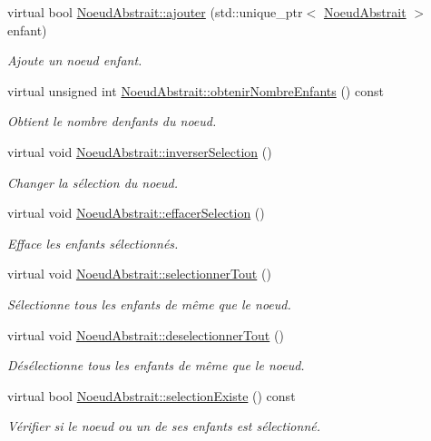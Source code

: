 \begin{DoxyCompactItemize}
virtual bool \hyperlink{group__inf2990_ga7051399643afa57468ef07444a085a85}{Noeud\+Abstrait\+::ajouter} (std\+::unique\+\_\+ptr$<$ \hyperlink{class_noeud_abstrait}{Noeud\+Abstrait} $>$ enfant)
\begin{DoxyCompactList}\small\item\em Ajoute un noeud enfant. \end{DoxyCompactList}\item 
virtual unsigned int \hyperlink{group__inf2990_gad5a99959e905fc2d9f0fef16a02546a2}{Noeud\+Abstrait\+::obtenir\+Nombre\+Enfants} () const 
\begin{DoxyCompactList}\small\item\em Obtient le nombre d\textquotesingle{}enfants du noeud. \end{DoxyCompactList}\item 
virtual void \hyperlink{group__inf2990_ga2516eef94f98d4951baff6fd45020725}{Noeud\+Abstrait\+::inverser\+Selection} ()
\begin{DoxyCompactList}\small\item\em Changer la sélection du noeud. \end{DoxyCompactList}\item 
virtual void \hyperlink{group__inf2990_gaf6440c1b4ab6861f0ace6ba410c1fc84}{Noeud\+Abstrait\+::effacer\+Selection} ()
\begin{DoxyCompactList}\small\item\em Efface les enfants sélectionnés. \end{DoxyCompactList}\item 
virtual void \hyperlink{group__inf2990_gaa9b1fa06dad2695ea6870411c62652b3}{Noeud\+Abstrait\+::selectionner\+Tout} ()
\begin{DoxyCompactList}\small\item\em Sélectionne tous les enfants de même que le noeud. \end{DoxyCompactList}\item 
virtual void \hyperlink{group__inf2990_ga4f942bd122fc3402537ecac737c5248a}{Noeud\+Abstrait\+::deselectionner\+Tout} ()
\begin{DoxyCompactList}\small\item\em Désélectionne tous les enfants de même que le noeud. \end{DoxyCompactList}\item 
virtual bool \hyperlink{group__inf2990_gae7c702b865babd20ddd30dd776adc82b}{Noeud\+Abstrait\+::selection\+Existe} () const 
\begin{DoxyCompactList}\small\item\em Vérifier si le noeud ou un de ses enfants est sélectionné. \end{DoxyCompactList}\item 

\end{DoxyCompactItemize}

